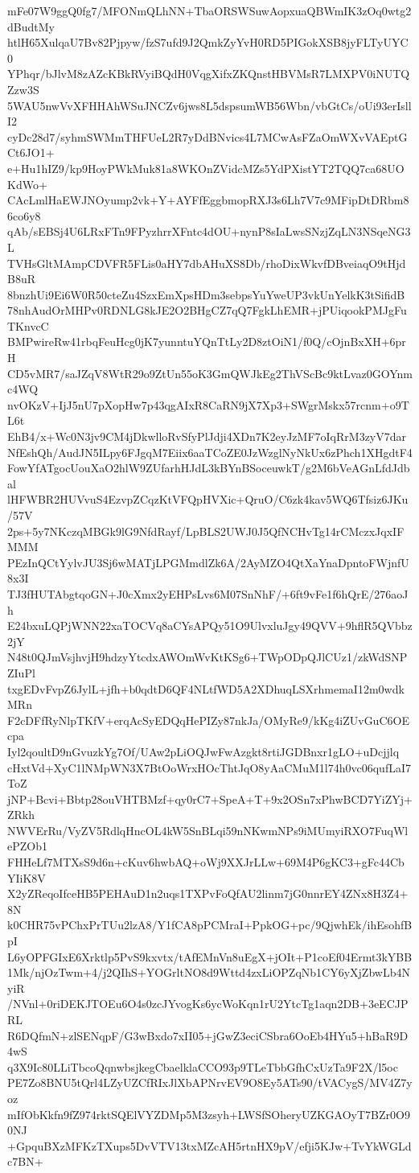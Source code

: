 mFe07W9ggQ0fg7/MFONmQLhNN+TbaORSWSuwAopxuaQBWmIK3zOq0wtg2dBudtMy
htlH65XulqaU7Bv82Pjpyw/fzS7ufd9J2QmkZyYvH0RD5PIGokXSB8jyFLTyUYC0
YPhqr/bJlvM8zAZcKBkRVyiBQdH0VqgXifxZKQnstHBVMsR7LMXPV0iNUTQZzw3S
5WAU5nwVvXFHHAhWSuJNCZv6jws8L5dspsumWB56Wbn/vbGtCs/oUi93erIsllI2
cyDc28d7/syhmSWMmTHFUeL2R7yDdBNvics4L7MCwAsFZaOmWXvVAEptGCt6JO1+
e+Hu1hIZ9/kp9HoyPWkMuk81a8WKOnZVidcMZs5YdPXistYT2TQQ7ca68UOKdWo+
CAcLmlHaEWJNOyump2vk+Y+AYFfEggbmopRXJ3s6Lh7V7c9MFipDtDRbm86co6y8
qAb/sEBSj4U6LRxFTn9FPyzhrrXFntc4dOU+nynP8sIaLwsSNzjZqLN3NSqeNG3L
TVHsGltMAmpCDVFR5FLis0aHY7dbAHuXS8Db/rhoDixWkvfDBveiaqO9tHjdB8uR
8bnzhUi9Ei6W0R50cteZu4SzxEmXpsHDm3sebpsYuYweUP3vkUnYelkK3tSifidB
78nhAudOrMHPv0RDNLG8kJE2O2BHgCZ7qQ7FgkLhEMR+jPUiqookPMJgFuTKnvcC
BMPwireRw41rbqFeuHcg0jK7yunntuYQnTtLy2D8ztOiN1/f0Q/cOjnBxXH+6prH
CD5vMR7/saJZqV8WtR29o9ZtUn55oK3GmQWJkEg2ThVScBc9ktLvaz0GOYnmc4WQ
nvOKzV+IjJ5nU7pXopHw7p43qgAIxR8CaRN9jX7Xp3+SWgrMskx57rcnm+o9TL6t
EhB4/x+Wc0N3jv9CM4jDkwlloRvSfyPlJdji4XDn7K2eyJzMF7oIqRrM3zyV7dar
NfEshQh/AudJN5ILpy6FJgqM7Eiix6aaTCoZE0JzWzglNyNkUx6zPhch1XHgdtF4
FowYfATgocUouXaO2hlW9ZUfarhHJdL3kBYnBSoceuwkT/g2M6bVeAGnLfdJdbal
lHFWBR2HUVvuS4EzvpZCqzKtVFQpHVXic+QruO/C6zk4kav5WQ6Tfsiz6JKu/57V
2ps+5y7NKczqMBGk9lG9NfdRayf/LpBLS2UWJ0J5QfNCHvTg14rCMczxJqxIFMMM
PEzInQCtYylvJU3Sj6wMATjLPGMmdlZk6A/2AyMZO4QtXaYnaDpntoFWjnfU8x3I
TJ3fHUTAbgtqoGN+J0cXmx2yEHPsLvs6M07SnNhF/+6ft9vFe1f6hQrE/276aoJh
E24bxuLQPjWNN22xaTOCVq8aCYsAPQy51O9UlvxluJgy49QVV+9hflR5QVbbz2jY
N48t0QJmVsjhvjH9hdzyYtcdxAWOmWvKtKSg6+TWpODpQJlCUz1/zkWdSNPZIuPl
txgEDvFvpZ6JylL+jfh+b0qdtD6QF4NLtfWD5A2XDhuqLSXrhmemaI12m0wdkMRn
F2cDFfRyNlpTKfV+erqAcSyEDQqHePIZy87nkJa/OMyRe9/kKg4iZUvGuC6OEcpa
Iyl2qoultD9nGvuzkYg7Of/UAw2pLiOQJwFwAzgkt8rtiJGDBnxr1gLO+uDcjjlq
cHxtVd+XyC1lNMpWN3X7BtOoWrxHOcThtJqO8yAaCMuM1l74h0vc06qufLaI7ToZ
jNP+Bcvi+Bbtp28ouVHTBMzf+qy0rC7+SpeA+T+9x2OSn7xPhwBCD7YiZYj+ZRkh
NWVErRu/VyZV5RdlqHncOL4kW5SnBLqi59nNKwmNPs9iMUmyiRXO7FuqWlePZOb1
FHHeLf7MTXsS9d6n+cKuv6hwbAQ+oWj9XXJrLLw+69M4P6gKC3+gFc44CbYIiK8V
X2yZReqoIfceHB5PEHAuD1n2uqs1TXPvFoQfAU2linm7jG0nnrEY4ZNx8H3Z4+8N
k0CHR75vPChxPrTUu2lzA8/Y1fCA8pPCMraI+PpkOG+pc/9QjwhEk/ihEsohfBpI
L6yOPFGIxE6Xrktlp5PvS9kxvtx/tAfEMnVn8uEgX+jOIt+P1coEf04Ermt3kYBB
1Mk/njOzTwm+4/j2QIhS+YOGrltNO8d9Wttd4zxLiOPZqNb1CY6yXjZbwLb4NyiR
/NVnl+0riDEKJTOEu6O4s0zcJYvogKs6ycWoKqn1rU2YtcTg1aqn2DB+3eECJPRL
R6DQfmN+zlSENqpF/G3wBxdo7xII05+jGwZ3eciCSbra6OoEb4HYu5+hBaR9D4wS
q3X9Ic80LLiTbcoQqnwbsjkegCbaelklaCCO93p9TLeTbbGfhCxUzTa9F2X/l5oc
PE7Zo8BNU5tQrl4LZyUZCfRIxJlXbAPNrvEV9O8Ey5ATs90/tVACygS/MV4Z7yoz
mIfObKkfn9fZ974rktSQElVYZDMp5M3zsyh+LWSfSOheryUZKGAOyT7BZr0O90NJ
+GpquBXzMFKzTXups5DvVTV13txMZcAH5rtnHX9pV/efji5KJw+TvYkWGLdc7BN+

